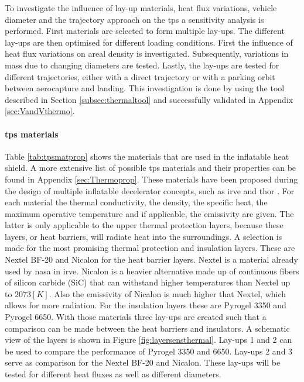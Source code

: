 To investigate the influence of lay-up materials, heat flux variations, vehicle diameter and the trajectory approach on the \gls{tps} a sensitivity analysis is performed. First materials are selected to form multiple lay-ups. The different lay-ups are then optimised for different loading conditions. First the influence of heat flux variations on areal density is investigated. Subsequently, variations in mass due to changing diameters are tested. Lastly, the lay-ups are tested for different trajectories, either with a direct trajectory or with a parking orbit between aerocapture and landing. This investigation is done by using the tool described in Section \ref{subsec:thermaltool} and successfully validated in Appendix \ref{sec:VandVthermo}.

\paragraph{\gls{tps} materials}
Table \ref{tab:tpsmatprop} shows the materials that are used in the inflatable heat shield. A more extensive list of possible \gls{tps} materials and their properties can be found in Appendix \ref{sec:Thermoprop}. These materials have been proposed during the design of multiple inflatable decelerator concepts, such as \gls{irve} and \gls{thor} \cite{Hughes2005}. For each material the thermal conductivity, the density, the specific heat, the maximum operative temperature and if applicable, the emissivity are given. The latter is only applicable to the upper thermal protection layers, because these layers, or heat barriers, will radiate heat into the surroundings.
\newline\newline
A selection is made for the most promising thermal protection and insulation layers. These are Nextel BF-20 and Nicalon for the heat barrier layers. Nextel is a material already used by \gls{nasa} in \gls{irve}. Nicalon is a heavier alternative made up of continuous fibers of silicon carbide (SiC) that can withstand higher temperatures than Nextel up to $2073 \left[K\right]$. Also the emissivity of Nicalon is much higher that Nextel, which allows for more radiation. For the insulation layers these are Pyrogel 3350 and Pyrogel 6650. With those materials three lay-ups are created such that a comparison can be made between the heat barriers and insulators. A schematic view of the layers is shown in Figure \ref{fig:layersensthermal}. Lay-ups 1 and 2 can be used to compare the performance of Pyrogel 3350 and 6650. Lay-ups 2 and 3 serve as comparison for the Nextel BF-20 and Nicalon. These lay-ups will be tested for different heat fluxes as well as different diameters.

